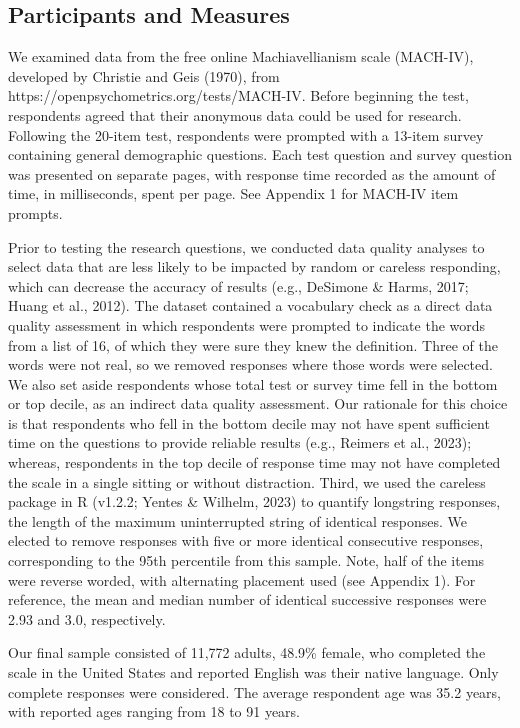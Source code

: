 \documentclass[
]{agujournal2019}
\begin{document}
\subsection{Participants and Measures}\label{participants-and-measures}

We examined data from the free online Machiavellianism scale (MACH-IV),
developed by Christie and Geis (1970), from
https://openpsychometrics.org/tests/MACH-IV. Before beginning the test,
respondents agreed that their anonymous data could be used for research.
Following the 20-item test, respondents were prompted with a 13-item
survey containing general demographic questions. Each test question and
survey question was presented on separate pages, with response time
recorded as the amount of time, in milliseconds, spent per page. See
Appendix 1 for MACH-IV item prompts.

Prior to testing the research questions, we conducted data quality
analyses to select data that are less likely to be impacted by random or
careless responding, which can decrease the accuracy of results (e.g.,
DeSimone \& Harms, 2017; Huang et al., 2012). The dataset contained a
vocabulary check as a direct data quality assessment in which
respondents were prompted to indicate the words from a list of 16, of
which they were sure they knew the definition. Three of the words were
not real, so we removed responses where those words were selected. We
also set aside respondents whose total test or survey time fell in the
bottom or top decile, as an indirect data quality assessment. Our
rationale for this choice is that respondents who fell in the bottom
decile may not have spent sufficient time on the questions to provide
reliable results (e.g., Reimers et al., 2023); whereas, respondents in
the top decile of response time may not have completed the scale in a
single sitting or without distraction. Third, we used the careless
package in R (v1.2.2; Yentes \& Wilhelm, 2023) to quantify longstring
responses, the length of the maximum uninterrupted string of identical
responses. We elected to remove responses with five or more identical
consecutive responses, corresponding to the 95th percentile from this
sample. Note, half of the items were reverse worded, with alternating
placement used (see Appendix 1). For reference, the mean and median
number of identical successive responses were 2.93 and 3.0,
respectively.

Our final sample consisted of 11,772 adults, 48.9\% female, who
completed the scale in the United States and reported English was their
native language. Only complete responses were considered. The average
respondent age was 35.2 years, with reported ages ranging from 18 to 91
years.
\end{document}
